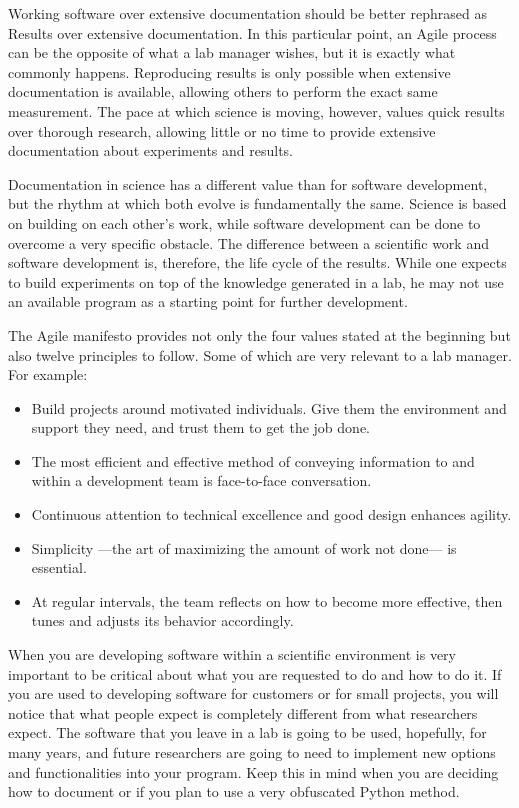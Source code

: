 Working software over extensive documentation should be better rephrased as Results over extensive documentation. In this particular point, an Agile process can be the opposite of what a lab manager wishes, but it is exactly what commonly happens. Reproducing results is only possible when extensive documentation is available, allowing others to perform the exact same measurement. The pace at which science is moving, however, values quick results over thorough research, allowing little or no time to provide extensive documentation about experiments and results.

Documentation in science has a different value than for software development, but the rhythm at which both evolve is fundamentally the same. Science is based on building on each other’s work, while software development can be done to overcome a very specific obstacle. The difference between a scientific work and software development is, therefore, the life cycle of the results. While one expects to build experiments on top of the knowledge generated in a lab, he may not use an available program as a starting point for further development.

The Agile manifesto provides not only the four values stated at the beginning but also twelve principles to follow. Some of which are very relevant to a lab manager. For example:

\begin{itemize}
 \item Build projects around motivated individuals. Give them the environment and support they need, and trust them to get the job done.
 \item The most efficient and effective method of conveying information to and within a development team is face-to-face conversation.
 \item Continuous attention to technical excellence and good design enhances agility.
 \item Simplicity —the art of maximizing the amount of work not done— is essential.
 \item At regular intervals, the team reflects on how to become more effective, then tunes and adjusts its behavior accordingly.
\end{itemize}

When you are developing software within a scientific environment is very important to be critical about what you are requested to do and how to do it. If you are used to developing software for customers or for small projects, you will notice that what people expect is completely different from what researchers expect. The software that you leave in a lab is going to be used, hopefully, for many years, and future researchers are going to need to implement new options and functionalities into your program. Keep this in mind when you are deciding how to document or if you plan to use a very obfuscated Python method.
